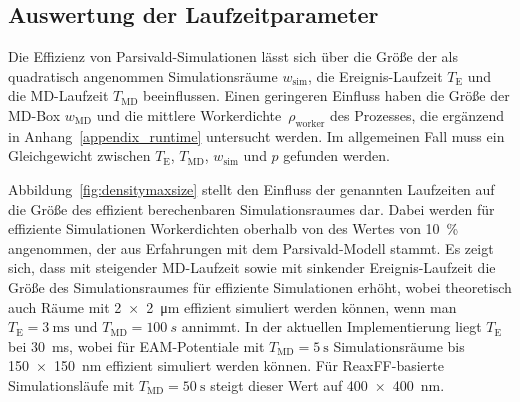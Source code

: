 
\subsection{Auswertung der Laufzeitparameter}

Die Effizienz von Parsivald-Simulationen lässt sich über die Größe der als quadratisch angenommen Simulationsräume $w_\text{sim}$, die Ereignis-Laufzeit $T_\text{E}$ und die MD-Laufzeit $T_\text{MD}$ beeinflussen.
Einen geringeren Einfluss haben die Größe der MD-Box $w_\text{MD}$ und die mittlere Workerdichte~$\rho_\text{worker}$ des Prozesses, die ergänzend in Anhang~\ref{appendix_runtime} untersucht werden.
Im allgemeinen Fall muss ein Gleichgewicht zwischen $T_\text{E}$, $T_\text{MD}$, $w_\text{sim}$ und $p$ gefunden werden.

Abbildung~\ref{fig:densitymaxsize} stellt den Einfluss der genannten Laufzeiten auf die Größe des effizient berechenbaren Simulationsraumes dar.
Dabei werden für effiziente Simulationen Workerdichten oberhalb von des Wertes von \SI{10}{\percent} angenommen, der aus Erfahrungen mit dem Parsivald-Modell stammt.
Es zeigt sich, dass mit steigender MD-Laufzeit sowie mit sinkender Ereignis-Laufzeit die Größe des Simulationsraumes für effiziente Simulationen erhöht, wobei theoretisch auch Räume mit \SI{2x2}{\micro\meter} effizient simuliert werden können, wenn man $T_\text{E} = \SI{3}{\milli\second}$ und $T_\text{MD}=\SI{100}{s}$ annimmt.
In der aktuellen Implementierung liegt $T_\text{E}$ bei \SI{30}{\milli\second}, wobei für EAM-Potentiale mit $T_\text{MD}=\SI{5}{\second}$ Simulationsräume bis \SI{150x150}{\nano\meter} effizient simuliert werden können.
Für ReaxFF-basierte Simulationsläufe mit $T_\text{MD}=\SI{50}{\second}$ steigt dieser Wert auf \SI{400x400}{\nano\meter}.

